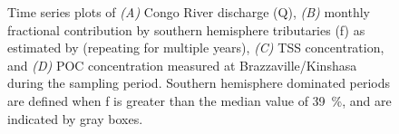 \begin{figure}[p]
	\caption[Environmental parameter time-series plots]{Time series plots of \textit{(A)} Congo River discharge (Q), \textit{(B)} monthly fractional contribution by southern hemisphere tributaries (f) as estimated by \citet{Bricquet:1993ve} (repeating for multiple years), \textit{(C)} TSS concentration, and \textit{(D)} POC concentration measured at Brazzaville/Kinshasa during the sampling period. Southern hemisphere dominated periods are defined when f is greater than the median value of \SI{39}{\%}, and are indicated by gray boxes.}
	\label{Ch4Fig:2} 
\end{figure}

